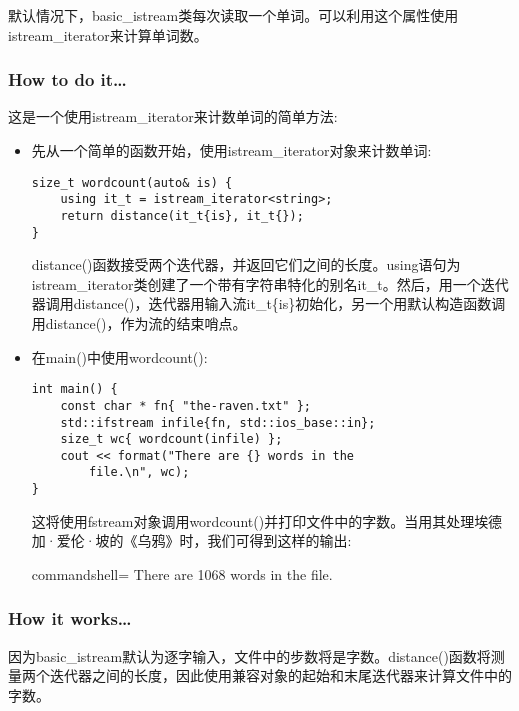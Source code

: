 
默认情况下，basic\_istream类每次读取一个单词。可以利用这个属性使用istream\_iterator来计算单词数。

\subsubsection{How to do it…}

这是一个使用istream\_iterator来计数单词的简单方法:

\begin{itemize}
\item 
先从一个简单的函数开始，使用istream\_iterator对象来计数单词:

\begin{lstlisting}[style=styleCXX]
size_t wordcount(auto& is) {
	using it_t = istream_iterator<string>;
	return distance(it_t{is}, it_t{});
}
\end{lstlisting}

distance()函数接受两个迭代器，并返回它们之间的长度。using语句为istream\_iterator类创建了一个带有字符串特化的别名it\_t。然后，用一个迭代器调用distance()，迭代器用输入流it\_t\{is\}初始化，另一个用默认构造函数调用distance()，作为流的结束哨点。

\item 
在main()中使用wordcount():

\begin{lstlisting}[style=styleCXX]
int main() {
	const char * fn{ "the-raven.txt" };
	std::ifstream infile{fn, std::ios_base::in};
	size_t wc{ wordcount(infile) };
	cout << format("There are {} words in the
		file.\n", wc);
}
\end{lstlisting}

这将使用fstream对象调用wordcount()并打印文件中的字数。当用其处理埃德加·爱伦·坡的《乌鸦》时，我们可得到这样的输出:

\begin{tcblisting}{commandshell={}}
There are 1068 words in the file.
\end{tcblisting}
\end{itemize}

\subsubsection{How it works…}

因为basic\_istream默认为逐字输入，文件中的步数将是字数。distance()函数将测量两个迭代器之间的长度，因此使用兼容对象的起始和末尾迭代器来计算文件中的字数。
